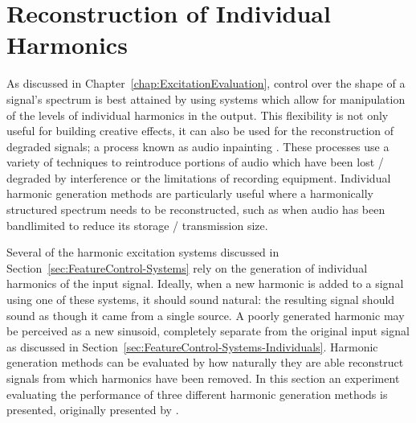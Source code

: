 \section{Reconstruction of Individual Harmonics}
\label{sec:PerceptualExperiments-Reconstruction}
	As discussed in Chapter~\ref{chap:ExcitationEvaluation}, control over the shape of a signal's spectrum is best
	attained by using systems which allow for manipulation of the levels of individual harmonics in the output. This
	flexibility is not only useful for building creative effects, it can also be used for the reconstruction of
	degraded signals; a process known as audio inpainting \citep{adler2012audio}. These processes use a variety of
	techniques to reintroduce portions of audio which have been lost / degraded by interference or the limitations of
	recording equipment. Individual harmonic generation methods are particularly useful where a harmonically structured
	spectrum needs to be reconstructed, such as when audio has been bandlimited to reduce its storage / transmission
	size.

	Several of the harmonic excitation systems discussed in Section~\ref{sec:FeatureControl-Systems} rely on the
	generation of individual harmonics of the input signal.  Ideally, when a new harmonic is added to a signal using
	one of these systems, it should sound natural: the resulting signal should sound as though it came from a single
	source. A poorly generated harmonic may be perceived as a new sinusoid, completely separate from the original input
	signal as discussed in Section~\ref{sec:FeatureControl-Systems-Individuals}.  Harmonic generation methods can be
	evaluated by how naturally they are able reconstruct signals from which harmonics have been removed. In this
	section an experiment evaluating the performance of three different harmonic generation methods is presented,
	originally presented by \citet{enderby2013methods}.

